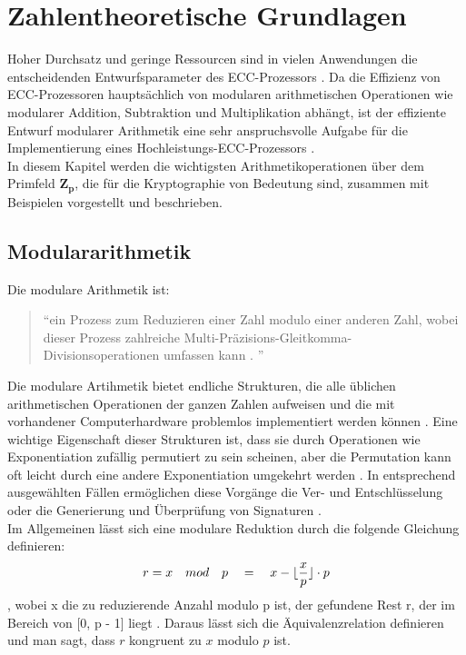 \chapter{Zahlentheoretische Grundlagen}

Hoher Durchsatz und geringe Ressourcen sind in vielen Anwendungen die entscheidenden Entwurfsparameter des ECC-Prozessors \cite{Hossain2019}.
Da die Effizienz von ECC-Prozessoren hauptsächlich von modularen
arithmetischen Operationen wie modularer Addition, Subtraktion und Multiplikation abhängt, ist der effiziente Entwurf modularer
Arithmetik eine sehr anspruchsvolle Aufgabe für die
Implementierung eines Hochleistungs-ECC-Prozessors \cite{Hossain2019}.\\ 

In diesem Kapitel werden die wichtigsten Arithmetikoperationen  über dem Primfeld $ \mathbf{ Z_p } $, die für die Kryptographie von Bedeutung sind, zusammen mit Beispielen vorgestellt und beschrieben. 

\section{Modulararithmetik}

Die modulare Arithmetik ist:
\begin{quote} \enquote{ein Prozess zum Reduzieren einer Zahl modulo einer
anderen Zahl, wobei dieser Prozess zahlreiche
Multi-Präzisions-Gleitkomma-Divisionsoperationen
umfassen kann \cite{patent}.
}\end{quote} 
Die modulare Artihmetik bietet endliche Strukturen, die alle üblichen arithmetischen Operationen der ganzen Zahlen aufweisen und die mit vorhandener Computerhardware problemlos implementiert werden können \cite{Contini2011}.
Eine wichtige Eigenschaft dieser Strukturen ist, dass sie durch Operationen wie Exponentiation zufällig permutiert zu sein scheinen, aber die Permutation kann oft leicht durch eine andere Exponentiation umgekehrt werden \cite{Contini2011}.
In entsprechend ausgewählten Fällen ermöglichen diese Vorgänge die Ver- und
Entschlüsselung oder die Generierung und Überprüfung von Signaturen
\cite{Contini2011}.\\

Im Allgemeinen lässt sich eine modulare Reduktion durch die folgende Gleichung definieren: \[ r = x \quad mod \quad p \quad = \quad x - \lfloor\frac{x}{p}\rfloor \cdot p \], wobei x die zu reduzierende Anzahl modulo p ist, der gefundene Rest r, der im Bereich von [0, p - 1] liegt \cite{patent}. Daraus lässt sich die Äquivalenzrelation definieren und man sagt, dass $ r $ kongruent zu $ x $ modulo $ p $ ist.\\

